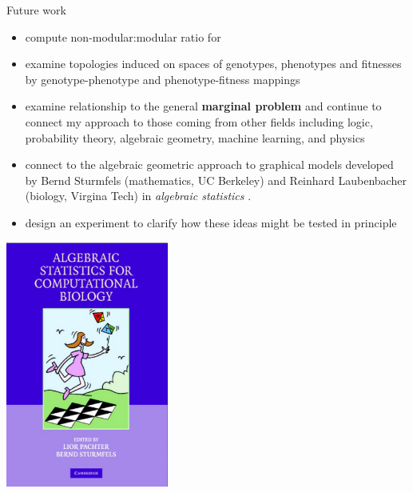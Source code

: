 \begin{frame}
\begin{footnotesize}
\begin{block}{Future work}
\begin{itemize}
\item compute non-modular:modular ratio for
\begin{enumerate}
\end{enumerate}
\item examine topologies induced on spaces of genotypes, phenotypes and fitnesses by genotype-phenotype and phenotype-fitness mappings
\item examine relationship to the general \textbf{marginal problem} and continue to connect my approach to those coming from other fields including logic, probability theory, algebraic geometry, machine learning, and physics
\item connect to the algebraic geometric approach to graphical models developed by Bernd Sturmfels (mathematics, UC Berkeley) and Reinhard Laubenbacher (biology, Virgina Tech) in \emph{algebraic statistics} \cite{PachterLior2005}.
\item design an experiment to clarify how these ideas might be tested in principle
\end{itemize}
\end{block}
\end{footnotesize}
\end{frame}

\begin{frame}
\vspace{3em}
\begin{center}
\includegraphics[width=0.4\textwidth]{fig/ASCB_Cover.jpg}
\end{center}
\end{frame}
